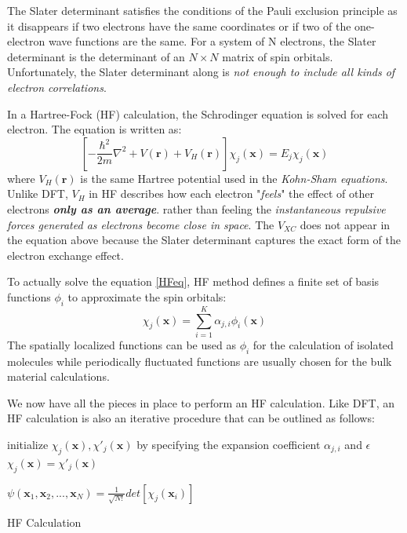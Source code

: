 \documentclass[12pt]{article}
\begin{document}
The Slater determinant satisfies the conditions of the Pauli exclusion principle as it disappears if two electrons have the same coordinates or if two of the one-electron wave functions are the same. For a system of N electrons, the Slater determinant is the determinant of an $N\times N$ matrix of spin orbitals. Unfortunately, the Slater determinant along is \emph{not enough to include all kinds of electron correlations}.

In a Hartree-Fock (HF) calculation, the Schrodinger equation is solved for each electron. The equation is written as:
\begin{equation}
    \label{HFeq}
    [-\frac{\hbar^2}{2m}\nabla^2+V(\boldsymbol{r})+V_H(\boldsymbol{r})]\chi_j(\boldsymbol{x}) = E_j\chi_j(\boldsymbol{x})
\end{equation}
where $V_H(\boldsymbol{r})$ is the same Hartree potential used in the \textit{Kohn-Sham equations}. Unlike DFT, $V_H$ in HF describes how each electron "\textit{feels}" the effect of other electrons \textbf{\emph{only as an average}}. rather than feeling the \emph{instantaneous repulsive forces generated as electrons become close in space}. The $V_{XC}$ does not appear in the equation above because the Slater determinant captures the exact form of the electron exchange effect.

To actually solve the equation \ref{HFeq}, HF method defines a finite set of basis functions $\phi_i$ to approximate the spin orbitals:
\begin{equation}
    \chi_j(\boldsymbol{x}) = \sum_{i=1}^K\alpha_{j,i}\phi_i(\boldsymbol{x})
\end{equation}
The spatially localized functions can be used as $\phi_i$ for the calculation of isolated molecules while periodically fluctuated functions are usually chosen for the bulk material calculations. 

We now have all the pieces in place to perform an HF calculation. Like DFT, an HF calculation is also an iterative procedure that can be outlined as follows:

\begin{algorithm}[H]
\SetAlgoLined
{}
 initialize $\chi_j(\boldsymbol{x}),\chi'_j(\boldsymbol{x})$ by specifying the expansion coefficient $\alpha_{j,i}$ and $\epsilon$\;
 $\chi_j(\boldsymbol{x})=\chi'_j(\boldsymbol{x})$
 
 $\psi(\boldsymbol{x}_1,\boldsymbol{x}_2,...,\boldsymbol{x}_N)=\frac{1}{\sqrt{N!}}det[\chi_j(\boldsymbol{x}_i)]$
\caption{HF Calculation}
\end{algorithm}
\end{document}
